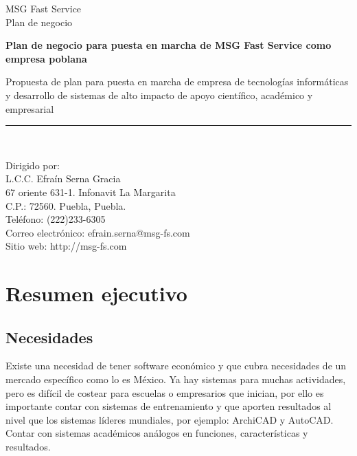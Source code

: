 \documentclass[12pt,spanish,lettersize]{report}
\begin{document}
\begin{titlepage}
\begin{center}
MSG Fast Service\\
\vspace*{0.15in}
Plan de negocio \\
\vspace*{0.6in}
\vspace*{0.2in}
\begin{Large}
\textbf{Plan de negocio para puesta en marcha de MSG Fast Service como empresa poblana} \\
\end{Large}
\vspace*{0.3in}
\begin{large}
Propuesta de plan para puesta en marcha de empresa de tecnolog\'ias inform\'aticas y desarrollo de sistemas de alto impacto de apoyo cient\'ifico, acad\'emico y empresarial\\
\end{large}
\vspace*{0.3in}
\rule{80mm}{0.1mm}\\
\vspace*{0.1in}
\begin{large}
Dirigido por: \\
L.C.C. Efra\'in Serna Gracia \\
\vspace*{0.3in}
67 oriente 631-1. Infonavit La Margarita\\
C.P.: 72560. Puebla, Puebla.\\
Tel\'efono: (222)233-6305\\
Correo electr\'onico: efrain.serna@msg-fs.com\\
Sitio web: http://msg-fs.com
\end{large}
\end{center}
\end{titlepage}
\tableofcontents
\chapter{Resumen ejecutivo}
\section{Necesidades}
Existe una necesidad de tener software econ\'omico y que cubra necesidades de un mercado espec\'ifico como lo es M\'exico. Ya hay sistemas para muchas actividades, pero es dif\'icil de costear para escuelas o empresarios que inician, por ello es importante contar con sistemas de entrenamiento y que aporten resultados al nivel que los sistemas l\'ideres mundiales, por ejemplo: ArchiCAD y AutoCAD. Contar con sistemas acad\'emicos an\'alogos en funciones, caracter\'isticas y resultados.\\
\end{document}
